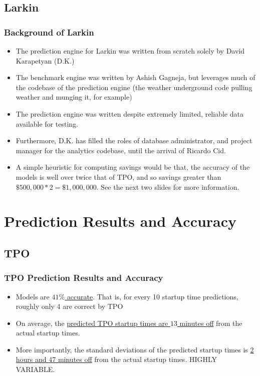 \documentclass{beamer}
\begin{document}
\subsection{Larkin}
\begin{frame}
	\frametitle{Background of Larkin}
	\begin{itemize}
	\item The prediction engine for Larkin was written from scratch solely by David Karapetyan (D.K.)
	\item The benchmark engine was written by Ashish Gagneja, but leverages much of the codebase
		of the prediction engine (the weather underground code pulling weather and munging it, for example)
	\item The prediction engine was written despite extremely limited, reliable data available for testing.
	\item Furthermore, D.K. has filled the roles of database administrator, and project manager for the 
	analytics codebase, until the arrival of Ricardo Cid.
	\item A simple heuristic for computing savings would be that, the accuracy of the models is well over twice that of TPO, and so savings greater than $\$500,000 * 2 = \$1,000,000$. See the next two slides for more information.
\end{itemize}
\end{frame}

\section{Prediction Results and Accuracy}
\subsection{TPO}
\begin{frame}
\frametitle{TPO Prediction Results and Accuracy}
\begin{itemize}
	\item Models are \underline{$41\%$ accurate}. That is, for every 10 startup time predictions, roughly only 4 are correct by TPO
	\item On average, the \underline{predicted TPO startup times are $13$ minutes off} from the actual startup times.
\item More importantly, the standard deviations of the predicted startup times is 
	\underline{2 hours and 47 minutes off} from the actual startup times. HIGHLY VARIABLE.
\end{itemize}
\end{frame}
\end{document}
